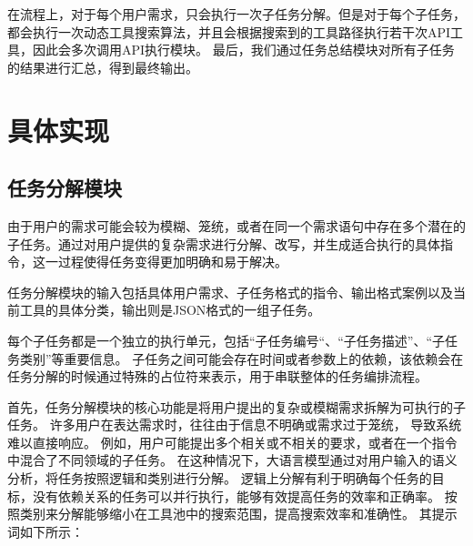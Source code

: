 在流程上，对于每个用户需求，只会执行一次子任务分解。但是对于每个子任务，都会执行一次动态工具搜索算法，并且会根据搜索到的工具路径执行若干次API工具，因此会多次调用API执行模块。
最后，我们通过任务总结模块对所有子任务的结果进行汇总，得到最终输出。

\section{具体实现}

\subsection{任务分解模块}

由于用户的需求可能会较为模糊、笼统，或者在同一个需求语句中存在多个潜在的子任务。通过对用户提供的复杂需求进行分解、改写，并生成适合执行的具体指令，这一过程使得任务变得更加明确和易于解决。

任务分解模块的输入包括具体用户需求、子任务格式的指令、输出格式案例以及当前工具的具体分类，输出则是JSON格式的一组子任务。

每个子任务都是一个独立的执行单元，包括“子任务编号“、“子任务描述”、“子任务类别”等重要信息。
子任务之间可能会存在时间或者参数上的依赖，该依赖会在任务分解的时候通过特殊的占位符来表示，用于串联整体的任务编排流程。

首先，任务分解模块的核心功能是将用户提出的复杂或模糊需求拆解为可执行的子任务。
许多用户在表达需求时，往往由于信息不明确或需求过于笼统，
导致系统难以直接响应。
例如，用户可能提出多个相关或不相关的要求，或者在一个指令中混合了不同领域的子任务。
在这种情况下，大语言模型通过对用户输入的语义分析，将任务按照逻辑和类别进行分解。
逻辑上分解有利于明确每个任务的目标，没有依赖关系的任务可以并行执行，能够有效提高任务的效率和正确率。
按照类别来分解能够缩小在工具池中的搜索范围，提高搜索效率和准确性。
其提示词如下所示：


